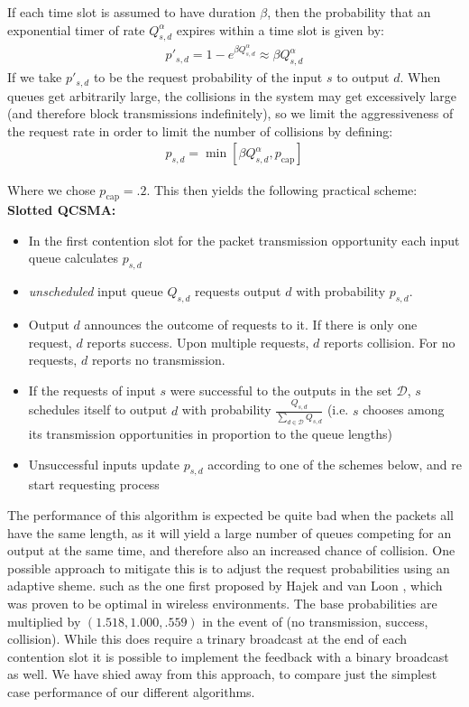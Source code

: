 \documentclass[11pt]{article}%
\begin{document}
If each time slot is assumed to have duration $\beta$, then the probability that an exponential timer of rate $Q_{s,d}^\alpha$ expires within a time slot is given by:
\begin{align}
p'_{s,d} =1-e^{\beta Q_{s,d}^\alpha} \approx \beta Q_{s,d}^\alpha
\end{align}
If we take $p'_{s,d}$ to be the request probability of the input $s$ to output $d$.  When queues get arbitrarily large, the collisions in the system may get excessively large (and therefore block transmissions indefinitely), so we limit the aggressiveness of the request rate in order to limit the number of collisions by defining:
\begin{align}  \label{geo_p}
p_{s,d} =\min \left[ \beta Q_{s,d}^\alpha,p_{\text{cap}}\right]
\end{align}

Where we chose $p_{\text{cap}}=.2$.  This then yields the following practical scheme:\\

{\bf Slotted QCSMA:}
\begin{itemize}
\item In the first contention slot for the packet transmission opportunity each input queue calculates $p_{s,d}$
\item {\it unscheduled} input queue $Q_{s,d}$ requests output $d$ with probability $p_{s,d}$.
\item Output $d$ announces the outcome of requests to it.  If there is only one request, $d$ reports success.  Upon multiple requests, $d$ reports collision. For no requests, $d$ reports no transmission.
\item If the requests of input $s$ were successful to the outputs in the set $\mathcal{D}$, $s$ schedules itself to output $d$ with probability $\frac{Q_{s,d}}{\sum_{d\in \mathcal{D}}Q_{s,d}}$ (i.e. $s$ chooses among its transmission opportunities in proportion to the queue lengths)
\item Unsuccessful inputs update $p_{s,d}$ according to one of the schemes below, and re start requesting process\\
\end{itemize}

The performance of this algorithm is expected be quite bad when the packets all have the same length, as it will yield a large number of queues competing for an output at the same time, and therefore also an increased chance of collision.  One possible approach to mitigate this is to adjust the request probabilities using an adaptive sheme. such as the one first proposed by Hajek and van Loon \cite{Hajek_van_Loon}, which was proven to be optimal in wireless environments.  The base probabilities are multiplied by $(1.518,1.000,.559)$  in the event of (no transmission, success, collision).  While this does require a trinary broadcast at the end of each contention slot it is possible to implement the feedback with a binary broadcast as well.  We have shied away from this approach, to compare just the simplest case performance of our different algorithms.
\end{document}

